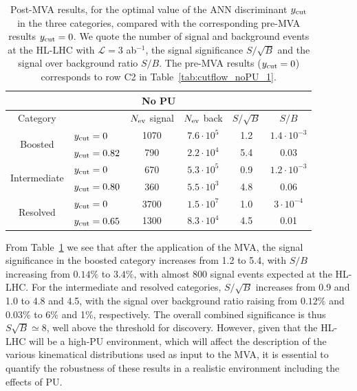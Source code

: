 \begin{table}[t]
  \centering
  \begin{tabular}{|c|l|c|c|c|c|}
    \hline
    \multicolumn{6}{|c|}{No PU} \\
    \hline
    \hline
    Category  &   &  $N_{\rm ev}$ signal &  $N_{\rm ev}$ back  &  $S/\sqrt{B}$ & $S/B$ \\ 
    \hline
    \hline
    \multirow{2}{*}{Boosted} &  $y_{\rm cut}=0$  & 1070 & $7.6\cdot 10^5$  & 1.2  & $1.4\cdot 10^{-3}$  \\
    &  $y_{\rm cut}=0.82$ & 790  & $2.2\cdot 10^4$   & 5.4  & 0.03 \\
    \hline
    \hline
    \multirow{2}{*}{Intermediate} &  $y_{\rm cut}=0$  & 670   & $5.3\cdot 10^5$
    & 0.9 & $1.2\cdot 10^{-3}$ \\
    &  $y_{\rm cut}=0.80$ & 360  & $5.5\cdot 10^3$  & 4.8 & 0.06\\
    \hline
    \hline
      \multirow{2}{*}{Resolved} &  $y_{\rm cut}=0$  & 3700 &  $1.5\cdot 10^{7}$ &  1.0 &$3\cdot 10^{-4}$ \\
    &  $y_{\rm cut}=0.65$ & 1300  & $8.3\cdot 10^{4}$ & 4.5 & 0.01 \\
    \hline
      \end{tabular}
  \caption{\small Post-MVA results, for the optimal value of the
    ANN discriminant $y_{\rm cut}$ in the three categories, compared with the
    corresponding
    pre-MVA results $y_{\rm cut}=0$.
    We quote the number of signal and
    background events
    at the HL-LHC with $\mathcal{L}=3$ ab$^{-1}$,
    the signal significance $S/\sqrt{B}$ and
    the signal over background ratio $S/B$.
    The pre-MVA results ($y_{\rm cut}=0$) corresponds to row C2 in
    Table~\ref{tab:cutflow_noPU_1}.
    \label{table:cutflowMVA}
  }
\end{table}




From Table~\ref{table:cutflowMVA} we see that
after the application of the MVA, 
the signal significance in the boosted category increases
from 1.2 to 5.4, with $S/B$ increasing from $0.14\%$ to $3.4\%$,
with almost 800 signal events expected at the HL-LHC.
%
For the intermediate and resolved categories, $S/\sqrt{B}$
increases from 0.9 and 1.0 to 4.8 and 4.5, with
the signal over background ratio raising from
$0.12\%$ and $0.03\%$ to 6\% and 1\%, respectively.
%
The overall combined significance is thus $S\sqrt{B}\simeq 8$,
well above the threshold for discovery.
%
However, given that the HL-LHC will be a high-PU environment,
which will affect the description of the various
kinematical distributions used as input to the MVA,
it is essential to quantify the robustness of these
results
in a realistic environment including the effects of PU.

